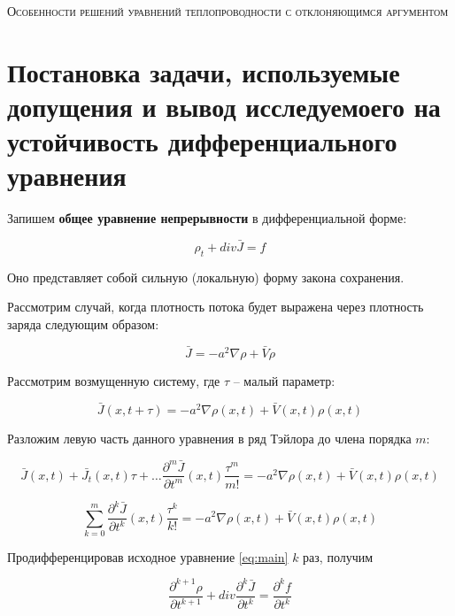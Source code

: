\begin{center}
\textsc{\Huge{Особенности решений уравнений теплопроводности с отклоняющимся аргументом\\}}
\end{center}

\section{Постановка задачи, используемые допущения и вывод исследуемоего на устойчивость дифференциального \\уравнения}

Запишем \textbf{общее уравнение непрерывности} в дифференциальной форме:

\begin{equation}\label{eq:main}
\rho_t + div \bar{J} = f
\end{equation}

Оно представляет собой сильную (локальную) форму закона сохранения.

Рассмотрим случай, когда плотность потока будет выражена через плотность заряда следующим образом:

\begin{equation}
\bar{J} = -a^2 \nabla \rho + \bar{V} \rho
\end{equation}

Рассмотрим возмущенную систему, где $\tau$ \--- малый параметр:

\begin{equation*}
\bar{J}(x,t+\tau) = -a^2 \nabla \rho(x,t) + \bar{V}(x,t) \rho(x,t)
\end{equation*}

Разложим левую часть данного уравнения в ряд Тэйлора до члена порядка $m$:

\begin{equation*}
\bar{J}(x,t) + \bar{J_t}(x,t) \tau + \dots \dfrac{\partial^m \bar{J}}{\partial t^m}(x,t) \dfrac{\tau^m}{m!} = -a^2 \nabla \rho(x,t) + \bar{V}(x,t) \rho(x,t)
\end{equation*}

\begin{equation}\label{eq:sub}
\sum\limits_{k=0}^{m} \dfrac{\partial^k \bar{J}}{\partial t^k}(x,t) \dfrac{\tau^k}{k!} = -a^2 \nabla \rho(x,t) + \bar{V}(x,t) \rho(x,t)
\end{equation}

Продифференцировав исходное уравнение \ref{eq:main} $k$ раз, получим

\begin{equation*}
\dfrac{\partial^{k+1} \rho}{\partial t^{k+1}} + div \dfrac{\partial^k \bar{J}}{\partial t^k} = \dfrac{\partial^k f}{\partial t^k}
\end{equation*}

